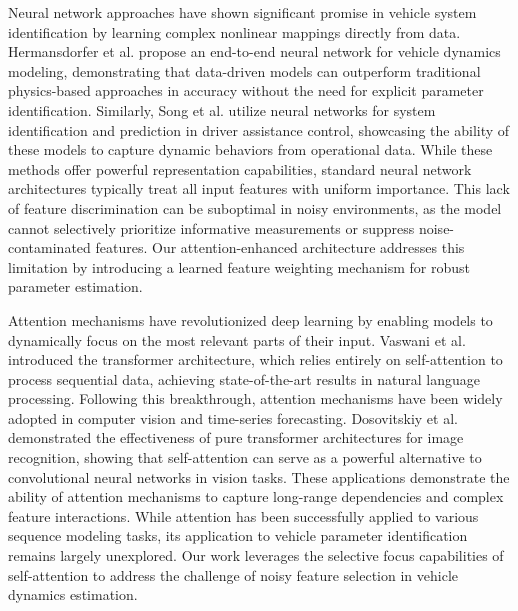 \documentclass[Afour,sageh,times]{sagej}
\begin{document}
Neural network approaches have shown significant promise in vehicle system identification by learning complex nonlinear mappings directly from data. Hermansdorfer et al. \citep{Hermansdorfer2020EndtoEnd} propose an end-to-end neural network for vehicle dynamics modeling, demonstrating that data-driven models can outperform traditional physics-based approaches in accuracy without the need for explicit parameter identification. Similarly, Song et al. \citep{Song2025DataDriven} utilize neural networks for system identification and prediction in driver assistance control, showcasing the ability of these models to capture dynamic behaviors from operational data. While these methods offer powerful representation capabilities, standard neural network architectures typically treat all input features with uniform importance. This lack of feature discrimination can be suboptimal in noisy environments, as the model cannot selectively prioritize informative measurements or suppress noise-contaminated features. Our attention-enhanced architecture addresses this limitation by introducing a learned feature weighting mechanism for robust parameter estimation.

Attention mechanisms have revolutionized deep learning by enabling models to dynamically focus on the most relevant parts of their input. Vaswani et al. \citep{Vaswani2017AttentionIA} introduced the transformer architecture, which relies entirely on self-attention to process sequential data, achieving state-of-the-art results in natural language processing. Following this breakthrough, attention mechanisms have been widely adopted in computer vision and time-series forecasting. Dosovitskiy et al. \citep{Dosovitskiy2020AnII} demonstrated the effectiveness of pure transformer architectures for image recognition, showing that self-attention can serve as a powerful alternative to convolutional neural networks in vision tasks. These applications demonstrate the ability of attention mechanisms to capture long-range dependencies and complex feature interactions. While attention has been successfully applied to various sequence modeling tasks, its application to vehicle parameter identification remains largely unexplored. Our work leverages the selective focus capabilities of self-attention to address the challenge of noisy feature selection in vehicle dynamics estimation.
\end{document}
